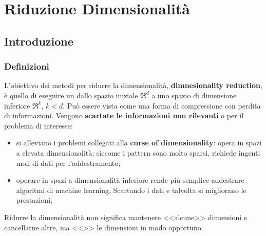 \chapter{Riduzione Dimensionalità}\label{chap:riduzione_dimensionalita} %
\section{Introduzione}\label{sec:dime_introduzione} %
\subsection{Definizioni}\label{sub:dime_definizioni} %
L'obiettivo dei metodi per ridurre la dimensionalità, \textbf{dimnesionality reduction}, è quello di eseguire un  dallo spazio iniziale $\Re^d$ a uno spazio di dimensione inferiore $\Re^k$, $k < d$.
\emptyln{}
Può essere vista come una forma di compressione con perdita di informazioni.
Vengono \textbf{scartate le informazioni non rilevanti} o  per il problema di interesse:
\begin{itemize}
    \item si alleviano i problemi collegati alla \textbf{curse of dimensionality}: opera in spazi a elevata dimensionalità; siccome i pattern sono molto sparsi, richiede ingenti moli di dati per l'addestramento;
    \item operare in spazi a dimensionalità inferiore rende più semplice addestrare algoritmi di machine learning. Scartando i dati  e  talvolta si migliorano le prestazioni;
\end{itemize}
\begin{warning}
    Ridurre la dimensionalità non significa mantenere <<alcune>> dimensioni e cancellarne altre, ma <<>> le dimensioni in modo opportuno.
\end{warning}
%
